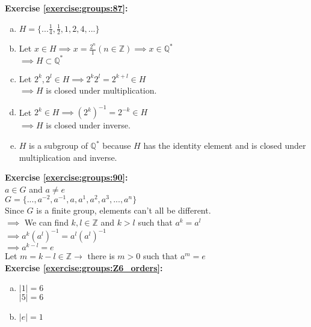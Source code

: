 \noindent\textbf{Exercise \ref{exercise:groups:87}:}
\begin{enumerate}[(a)]
\item
$H=\{...\displaystyle\frac{1}{4},\frac{1}{2},1,2,4,...\}$

\item
Let $x\in H\implies x=\displaystyle\frac{2^n}{1}(n\in {\mathbb Z})\implies x\in {\mathbb Q}^*$\\
$\implies H\subset {\mathbb Q}^*$

\item
Let $2^k,2^l\in H\implies 2^k2^l=2^{k+l}\in H$\\
$\implies H$ is closed under multiplication.

\item
Let $2^k\in H\implies (2^k)^{-1}=2^{-k}\in H$\\
$\implies H$ is closed under inverse.

\item
$H$ is a subgroup of ${\mathbb Q}^*$ because $H$ has the identity element and is closed under multiplication and inverse.
\end{enumerate}

\noindent\textbf{Exercise \ref{exercise:groups:90}:}\\
$a\in G$ and $a\neq e$\\
$G=\{...,a^{-2},a^{-1},a,a^1,a^2,a^3,...,a^n\}$\\
Since $G$ is a finite group, elements can't all be different.\\
$\implies$  We can find $k,l\in {\mathbb Z}$ and $k>l$ such that $a^k=a^l$\\
$\implies a^k(a^l)^{-1}=a^l(a^l)^{-1}$\\
$\implies a^{k-l}=e$\\
Let $m=k-l\in {\mathbb Z}\to$ there is $m>0$ such that $a^m=e$\\

\noindent\textbf{Exercise \ref{exercise:groups:Z6_orders}:}
\begin{enumerate}[(a)]
\item
$|1|=6$\\
$|5|=6$

\item
 $|e|=1$
\end{enumerate}

